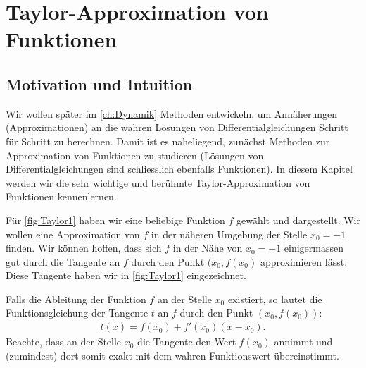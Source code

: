 \chapter{Taylor-Approximation von Funktionen}\label{ch:Taylor}

\section{Motivation und Intuition}
Wir wollen später im \cref{ch:Dynamik} Methoden entwickeln, um Annäherungen (Approximationen) an die wahren Lösungen von Differentialgleichungen Schritt für Schritt zu berechnen. Damit ist es naheliegend, zunächst Methoden zur Approximation von Funktionen zu studieren (Lösungen von Differentialgleichungen sind schliesslich ebenfalls Funktionen). In diesem Kapitel werden wir die sehr wichtige und berühmte Taylor-Approximation von Funktionen kennenlernen.

Für \cref{fig:Taylor1} haben wir eine beliebige Funktion $f$ gewählt und dargestellt. Wir wollen eine Approximation von $f$ in der näheren Umgebung der Stelle $x_0 = -1$ finden. Wir können hoffen, dass sich $f$ in der Nähe von $x_0 = -1$ einigermassen gut durch die Tangente an $f$ durch den Punkt $(x_0, f(x_0)$ approximieren lässt. Diese Tangente haben wir in \cref{fig:Taylor1} eingezeichnet.

\par
Falls die Ableitung der Funktion $f$ an der Stelle $x_0$ existiert, so lautet die Funktionsgleichung der Tangente $t$ an $f$ durch den Punkt $(x_0, f(x_0))$:
\begin{align*}
  t(x) = f(x_0) + f'(x_0)(x-x_0).
\end{align*}
Beachte, dass an der Stelle $x_0$ die Tangente den Wert $f(x_0)$ annimmt und (zumindest) dort somit exakt mit dem wahren Funktionswert übereinstimmt.

